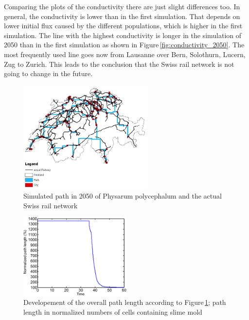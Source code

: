 \documentclass[11pt]{scrartcl}
\begin{document}
Comparing the plots of the conductivity there are just slight differences too. In general, the conductivity is lower than in the first simulation. That depends on lower initial flux caused by the different populations, which is higher in the first simulation. The line with the highest conductivity is longer in the simulation of 2050 than in the first simulation as shown in Figure\,\ref{fig:conductivity_2050}. The most frequently used line goes now from Lausanne over Bern, Solothurn, Lucern, Zug to Zurich. This leads to the conclusion that the Swiss rail network is not going to change in the future.

\begin{figure}[H]
	\centering
	\includegraphics[width=0.6\textwidth]{figures/path_railway_2050}
	\caption{Simulated path in 2050 of Physarum polycephalum and the actual Swiss rail network}
	\label{fig:path_2050}
\end{figure}

\begin{figure}[H]
	\centering
	\includegraphics[width=0.5\textwidth]{figures/plottrail2}
	\caption{Developement of the overall path length according to Figure\,\ref{fig:path_2050}; path length in normalized numbers of cells containing slime mold}
	\label{fig:plottrail_2050}
\end{figure}
\end{document}
